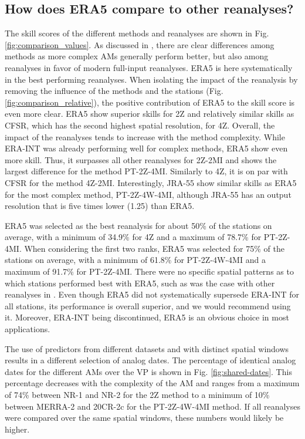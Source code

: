\documentclass[alpha-refs]{wiley-article}
\begin{document}
\subsection{How does ERA5 compare to other reanalyses?}
\label{sec:results_skill}

The skill scores of the different methods and reanalyses are shown in Fig. \ref{fig:comparison_values}. As discussed in \citet{Horton2018b}, there are clear differences among methods as more complex AMs generally perform better, but also among reanalyses in favor of modern full-input reanalyses. ERA5 is here systematically in the best performing reanalyses. When isolating the impact of the reanalysis by removing the influence of the methods and the stations (Fig. \ref{fig:comparison_relative}), the positive contribution of ERA5 to the skill score is even more clear. ERA5 show superior skills for 2Z and relatively similar skills as CFSR, which has the second highest spatial resolution, for 4Z. Overall, the impact of the reanalyses tends to increase with the method complexity. While ERA-INT was already performing well for complex methods, ERA5 show even more skill. Thus, it surpasses all other reanalyses for 2Z-2MI and shows the largest difference for the method PT-2Z-4MI. Similarly to 4Z, it is on par with CFSR for the method 4Z-2MI. Interestingly, JRA-55 show similar skills as ERA5 for the most complex method, PT-2Z-4W-4MI, although JRA-55 has an output resolution that is five times lower (1.25\degree) than ERA5.

ERA5 was selected as the best reanalysis for about 50\% of the stations on average, with a minimum of 34.9\% for 4Z and a maximum of 78.7\% for PT-2Z-4MI. When considering the first two ranks, ERA5 was selected for 75\% of the stations on average, with a minimum of 61.8\% for PT-2Z-4W-4MI and a maximum of 91.7\% for PT-2Z-4MI. There were no specific spatial patterns as to which stations performed best with ERA5, such as was the case with other reanalyses in \citet{Horton2018b}. Even though ERA5 did not systematically supersede ERA-INT for all stations, its performance is overall superior, and we would recommend using it. Moreover, ERA-INT being discontinued, ERA5 is an obvious choice in most applications.

The use of predictors from different datasets and with distinct spatial windows results in a different selection of analog dates. The percentage of identical analog dates for the different AMs over the VP is shown in Fig. \ref{fig:shared-dates}. This percentage decreases with the complexity of the AM and ranges from a maximum of 74\% between NR-1 and NR-2 for the 2Z method to a minimum of 10\% between MERRA-2 and 20CR-2c for the PT-2Z-4W-4MI method. If all reanalyses were compared over the same spatial windows, these numbers would likely be higher.
\end{document}
